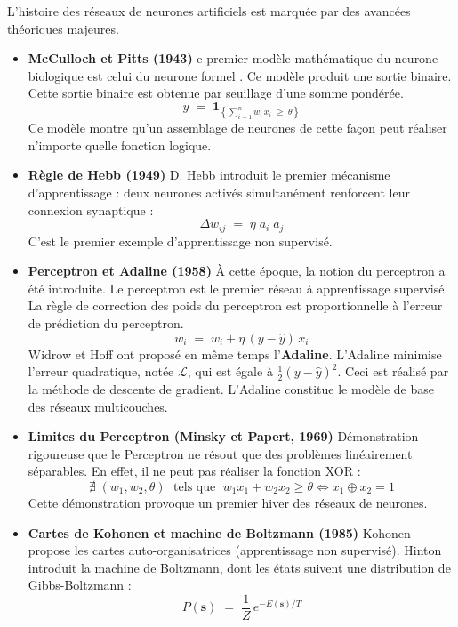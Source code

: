 L'histoire des réseaux de neurones artificiels est marquée par des avancées théoriques majeures.

\begin{itemize}[label=$\bullet$]
	
	\item \textbf{McCulloch et Pitts (1943)}
	e premier modèle mathématique du neurone biologique est celui du neurone formel \cite{[1]}. Ce modèle produit une sortie binaire. Cette sortie binaire est obtenue par seuillage d'une somme pondérée.
	\[
	y \;=\; \mathbf{1}_{\left\{ \sum_{i=1}^{n} w_i\,x_i \;\geq\; \theta \right\}}
	\]
	Ce modèle montre qu'un assemblage de neurones de cette façon peut réaliser n'importe quelle fonction logique.
	
	\item \textbf{Règle de Hebb (1949)}
	D. Hebb introduit le premier mécanisme d'apprentissage :
	deux neurones activés simultanément renforcent leur
	connexion synaptique :
	\[
	\Delta w_{ij} \;=\; \eta\; a_i\; a_j
	\]
	C'est le premier exemple d'apprentissage non supervisé.
	
	\item \textbf{Perceptron et Adaline (1958)}
	À cette époque, la notion du perceptron a été introduite. Le perceptron est le premier réseau à apprentissage supervisé. La règle de correction des poids du perceptron est proportionnelle à l'erreur de prédiction du perceptron.
	\[
	w_i \;=\; w_i + \eta\,(y - \hat{y})\,x_i
	\]
	Widrow et Hoff ont proposé en même temps l'\textbf{Adaline}.
	L'Adaline minimise l'erreur quadratique, notée $\mathcal{L}$, qui est égale à $\frac{1}{2}(y - \hat{y})^2$.
	Ceci est réalisé par la méthode de descente de gradient. L'Adaline constitue le modèle de base des réseaux multicouches.
	
	\item \textbf{Limites du Perceptron (Minsky et Papert, 1969)}
	Démonstration rigoureuse que le Perceptron ne résout que des problèmes linéairement séparables. En effet, il ne peut pas réaliser la fonction XOR :
	\[
	\nexists\;(w_1, w_2, \theta) \;\text{ tels que }\;
	w_1 x_1 + w_2 x_2 \geq \theta \iff x_1 \oplus x_2 = 1
	\]
	Cette démonstration provoque un premier hiver des réseaux
	de neurones.	
	\item \textbf{Cartes de Kohonen et machine de Boltzmann (1985)}
	Kohonen propose les cartes auto-organisatrices (apprentissage
	non supervisé). Hinton introduit la machine de Boltzmann,
	dont les états suivent une distribution de Gibbs-Boltzmann :
	\[
	P(\mathbf{s}) \;=\; \frac{1}{Z}\,
	e^{-E(\mathbf{s})/T}
	\]
	

\end{itemize}
